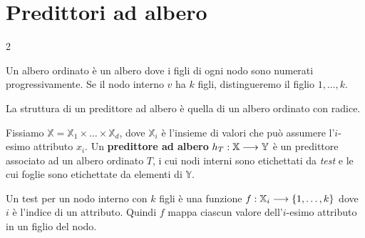 \documentclass[\main/main.tex]{subfiles}
\begin{document}
\chapter{Predittori ad albero}
\begin{multicols}{2}
\begin{definition}
    Un albero ordinato è un albero dove i figli di ogni nodo sono numerati progressivamente. Se il nodo interno \(v\) ha \(k\) figli, distingueremo il figlio \(1, \ldots, k\).
\end{definition}
\begin{definition}
    La struttura di un predittore ad albero è quella di un albero ordinato con radice. 
\end{definition}
\begin{definition}
    Fissiamo \(\mathbb{X} = \mathbb{X}_1 \times \ldots \times \mathbb{X}_d\), dove \(\mathbb{X}_i\) è l'insieme di valori che può assumere l'\(i\)-esimo attributo \(x_i\). Un \textbf{predittore ad albero} \(h_T:\mathbb{X}\longrightarrow \mathbb{Y}\) è un predittore associato ad un albero ordinato \(T\), i cui nodi interni sono etichettati da \textit{test} e le cui foglie sono etichettate da elementi di \(\mathbb{Y}\).
    
    Un test per un nodo interno con \(k\) figli è una funzione \(f:\mathbb{X}_i\longrightarrow \left\{1, \ldots, k\right\}\) dove \(i\) è l'indice di un attributo. Quindi \(f\) mappa ciascun valore dell'\(i\)-esimo attributo in un figlio del nodo.
    

\end{definition}
\end{multicols}
\end{document}
